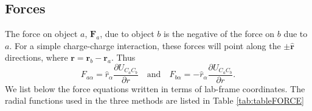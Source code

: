 \subsection{Forces}
The force on object $a$, $\mathbf{F}_a$, due to object
$b$ is the negative of the force on $b$ due to $a$. For
a simple charge-charge interaction, these forces will point along the
$\pm \hat{\mathbf{r}}$ directions, where $\mathbf{r}=\mathbf{r}_b -
\mathbf{r}_a $.  Thus
%
\begin{equation}
F_{a \alpha} = \hat{r}_\alpha \frac{\partial U_{C_a C_b}}{\partial r} 
\quad \text{and} \quad  F_{b \alpha} 
= - \hat{r}_\alpha \frac{\partial U_{C_a C_b}} {\partial r}  .
\end{equation}
%
We list below the force equations written in terms of lab-frame
coordinates.  The radial functions used in the three methods are listed
in Table \ref{tab:tableFORCE}
%
%
%
